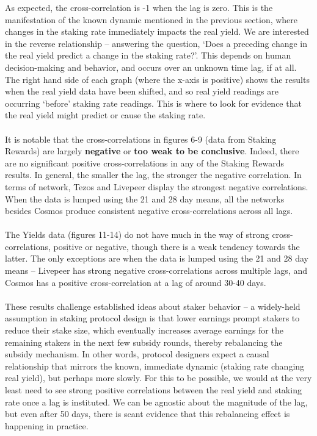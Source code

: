 \documentclass[longbibliography,nofootinbib]{revtex4-1}
\begin{document}
As expected, the cross-correlation is -1 when the lag is zero. This is the manifestation of the known dynamic mentioned in the previous section, where changes in the staking rate immediately impacts the real yield. We are interested in the reverse relationship – answering the question, `Does a preceding change in the real yield predict a change in the staking rate?'. This depends on human decision-making and behavior, and occurs over an unknown time lag, if at all. The right hand side of each graph (where the x-axis is positive) shows the results when the real yield data have been shifted, and so real yield readings are occurring `before' staking rate readings. This is where to look for evidence that the real yield might predict or cause the staking rate.
\\\\
It is notable that the cross-correlations in figures 6-9 (data from Staking Rewards) are largely \textbf{negative} or \textbf{too weak to be conclusive}. Indeed, there are no significant positive cross-correlations in any of the Staking Rewards results. In general, the smaller the lag, the stronger the negative correlation. In terms of network, Tezos and Livepeer display the strongest negative correlations. When the data is lumped using the 21 and 28 day means, all the networks besides Cosmos produce consistent negative cross-correlations across all lags.
\\\\
The Yields data (figures 11-14) do not have much in the way of strong cross-correlations, positive or negative, though there is a weak tendency towards the latter. The only exceptions are when the data is lumped using the 21 and 28 day means – Livepeer has strong negative cross-correlations across multiple lags, and Cosmos has a positive cross-correlation at a lag of around 30-40 days. 
\\\\
These results challenge established ideas about staker behavior – a widely-held assumption in staking protocol design is that lower earnings prompt stakers to reduce their stake size, which eventually increases average earnings for the remaining stakers in the next few subsidy rounds, thereby rebalancing the subsidy mechanism. In other words, protocol designers expect a causal relationship that mirrors the known, immediate dynamic (staking rate changing real yield), but perhaps more slowly. For this to be possible, we would at the very least need to see strong positive correlations between the real yield and staking rate once a lag is instituted. We can be agnostic about the magnitude of the lag, but even after 50 days, there is scant evidence that this rebalancing effect is happening in practice.
\end{document}
